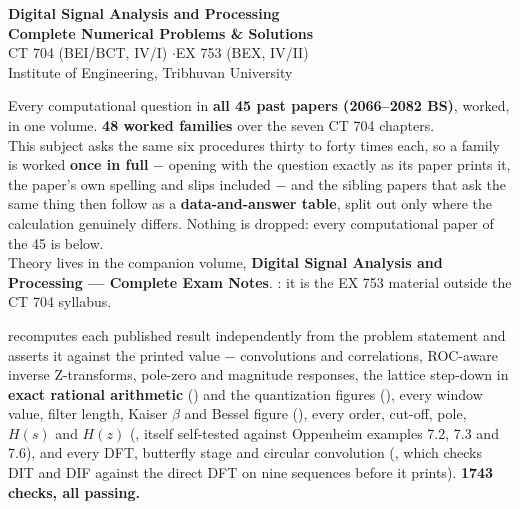\documentclass[10pt]{article}
\begin{document}
\thispagestyle{empty}
\vspace*{1.6cm}
\begin{center}
  {\Huge\bfseries\color{acc} Digital Signal Analysis and Processing}\\[6pt]
  {\LARGE\bfseries Complete Numerical Problems \& Solutions}\\[14pt]
  {\large\color{sub} CT 704 (BEI/BCT, IV/I) \quad$\cdot$\quad EX 753 (BEX, IV/II)}\\[3pt]
  {\color{sub} Institute of Engineering, Tribhuvan University}\\[18pt]
  \begin{minipage}{0.80\textwidth}
    \color{sub}\small
    Every computational question in \textbf{all 45 past papers (2066--2082 BS)}, worked,
    in one volume. \textbf{48 worked families} over the seven CT 704 chapters.\\[8pt]
     This subject asks the same six procedures thirty to
    forty times each, so a family is worked \textbf{once in full} $-$ opening with the
    question exactly as its paper prints it, the paper's own spelling and slips included
    $-$ and the sibling papers that ask the same thing then follow as a
    \textbf{data-and-answer table}, split out only where the calculation genuinely
    differs. Nothing is dropped: every computational paper of the 45 is below.\\[8pt]
    Theory lives in the companion volume, \textbf{Digital Signal Analysis and Processing
    --- Complete Exam Notes}. : it is the EX 753
    material outside the CT 704 syllabus.
  \end{minipage}
\end{center}

\vspace{10pt}


\par{}\vspace{12pt}
\begin{center}
\begin{minipage}{0.90\textwidth}\small\color{sub}
 recomputes each published result independently from the problem
statement and asserts it against the printed value $-$ convolutions and correlations,
ROC-aware inverse Z-transforms, pole-zero and magnitude responses, the lattice step-down
in \textbf{exact rational arithmetic} () and the quantization figures
(), every window value, filter length, Kaiser $\beta$ and Bessel figure
(), every order, cut-off, pole, $H(s)$ and $H(z)$ (, itself
self-tested against Oppenheim examples 7.2, 7.3 and 7.6), and every DFT, butterfly stage
and circular convolution (, which checks DIT and DIF against the direct DFT
on nine sequences before it prints). \textbf{1743 checks, all passing.}
\end{minipage}
\end{center}
\end{document}
